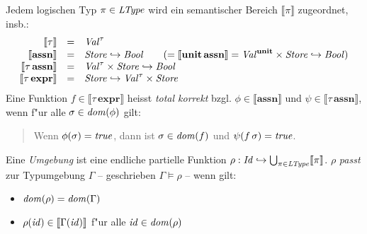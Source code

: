 \documentclass[12pt,a4paper,bigheadings]{scrartcl}
\newcommand{\semantic}[1]{\ensuremath{\llbracket#1\rrbracket}}
\newcommand{\assn}{\textbf{assn}}
\newcommand{\expr}{\textbf{expr}}
\begin{document}
Jedem logischen Typ $\pi \in {\text{\it LType\/}}$ wird ein semantischer Bereich $\semantic{\pi}$ zugeordnet,
insb.:
\[\begin{array}{rcl}
  \semantic{\tau} & = & \Val^\tau \\
  \semantic{\assn} & = & \Store \pto \Bool
                    \quad \quad (= \semantic{\unit\,\assn} = \Val^\unit \times \Store \pto \Bool) \\
  \semantic{\tau\,\assn} & = & \Val^\tau \times \Store \pto \Bool \\
  \semantic{\tau\,\expr} & = & \Store \pto \Val^\tau \times \Store
\end{array}\]
Eine Funktion $f \in \semantic{\tau\,\expr}$ heisst {\em total korrekt} bzgl. $\phi \in \semantic{\assn}$
und $\psi\in\semantic{\tau\,\assn}$, wenn f"ur alle $\sigma \in {\text{\it dom\/}}(\phi)$ gilt:
\begin{quote}
  Wenn $\phi(\sigma)={\text{\it true\/}}$, dann ist $\sigma\in{\text{\it dom\/}}(f)$ und $\psi(f\,\sigma) = {\text{\it true\/}}$.
\end{quote}
Eine {\em Umgebung} ist eine endliche partielle Funktion $\rho: \Id \pto \bigcup_{\pi\in\Ltype}\semantic{\pi}$.
$\rho$ {\em passt} zur Typumgebung $\Gamma$ -- geschrieben $\Gamma \models \rho$ -- wenn gilt:
\begin{itemize}
  \item ${\text{\it dom\/}}(\rho) = {\text{\it dom\/}}(\Gamma)$
  \item $\rho(\id) \in \semantic{\Gamma(\id)}$ f"ur alle ${\text{\it id\/}} \in {\text{\it dom\/}}(\rho)$
\end{itemize}
\end{document}
